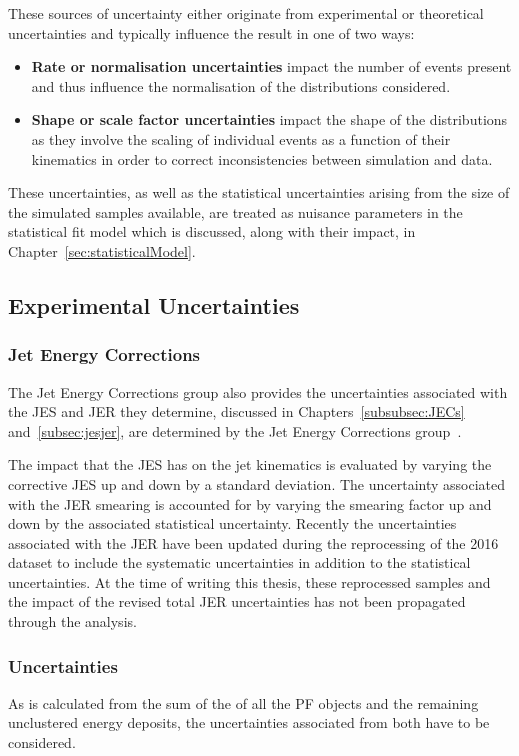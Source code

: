 These sources of uncertainty either originate from experimental or theoretical uncertainties and typically influence the result in one of two ways:
\begin{itemize}
\item \textbf{Rate or normalisation uncertainties} impact the number of events present and thus influence the  normalisation of the distributions considered.
\item \textbf{Shape or scale factor uncertainties} impact the shape of the distributions as they involve the scaling of individual events as a function of their kinematics in order to correct inconsistencies between simulation and data.
\end{itemize}

These uncertainties, as well as the statistical uncertainties arising from the size of the simulated samples available, are treated as nuisance parameters in the statistical fit model which is discussed, along with their impact, in Chapter~\ref{sec:statisticalModel}.

\subsection{Experimental Uncertainties}
\subsubsection{Jet Energy Corrections}
The Jet Energy Corrections group also provides the uncertainties associated with the JES and JER they determine, discussed in Chapters~\ref{subsubsec:JECs} and~\ref{subsec:jesjer}, are determined by the Jet Energy Corrections group~\cite{Khachatryan:2016kdb}. 

The impact that the JES has on the jet kinematics is evaluated by varying the corrective JES up and down by a standard deviation.
The uncertainty associated with the JER smearing is accounted for by varying the smearing factor up and down by the associated statistical uncertainty.
Recently the uncertainties associated with the JER have been updated during the reprocessing of the 2016 dataset to include the systematic uncertainties in addition to the statistical uncertainties.
At the time of writing this thesis, these reprocessed samples and the impact of the revised total JER uncertainties has not been propagated through the analysis.

\subsubsection{\MET Uncertainties}
As \MET is calculated from the sum of the \pT of all the PF objects and the remaining unclustered energy deposits, the uncertainties associated from both have to be considered.

